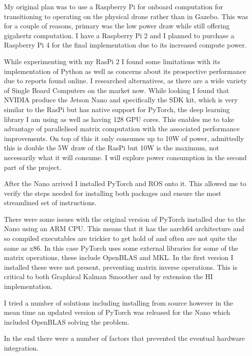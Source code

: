 \documentclass[]{../resources/final_report}
\begin{document}
My original plan was to use a Raspberry Pi for onboard computation for transitioning to 
operating on the physical drone rather than in Gazebo. This was for a couple of reasons, primary was 
the low power draw while still offering gigahertz computation. I have a Raspberry Pi 2 and I planned 
to purchase a Raspberry Pi 4 for the final implementation due to its increased compute power.

While experimenting with my RasPi 2 I found some limitations with its implementation of Python as 
well as concerns about its prospective performance due to reports found online. I researched 
alternatives, as there are a wide variety of Single Board Computers on the market now. While looking 
I found that NVIDIA produce the Jetson Nano and specifically the SDK kit, which is very similar to 
the RasPi but has native support for PyTorch, the deep learning library I am using as well as having 
128 GPU cores. This enables me to take advantage of parallelised matrix computation with the 
associated performance improvements. On top of this it only consumes up to 10W of power, admittedly 
this is double the 5W draw of the RasPi but 10W is the maximum, not necessarily what it will consume. 
I will explore power consumption in the second part of the project.

After the Nano arrived I installed PyTorch and ROS onto it. This allowed me to verify the steps 
needed for installing both packages and ensure the most streamlined set of instructions.

There were some issues with the original version of PyTorch installed due to the Nano using
an ARM CPU. This means that it has the aarch64 architecture and so compiled executables are trickier
to get hold of and often are not quite the same as x86. In this case PyTorch uses some external 
libraries for some of the matrix operations, these include OpenBLAS and MKL. In the first version 
I installed these were not present, preventing matrix inverse operations. This is critical 
to both Graphical Kalman Smoother and by extension the HI implementation.

I tried a number of solutions including installing from source however in the mean time an updated
version of PyTorch was released for the Nano which included OpenBLAS solving the problem.

In the end there were a number of factors that prevented the eventual hardware integration.
\end{document}
